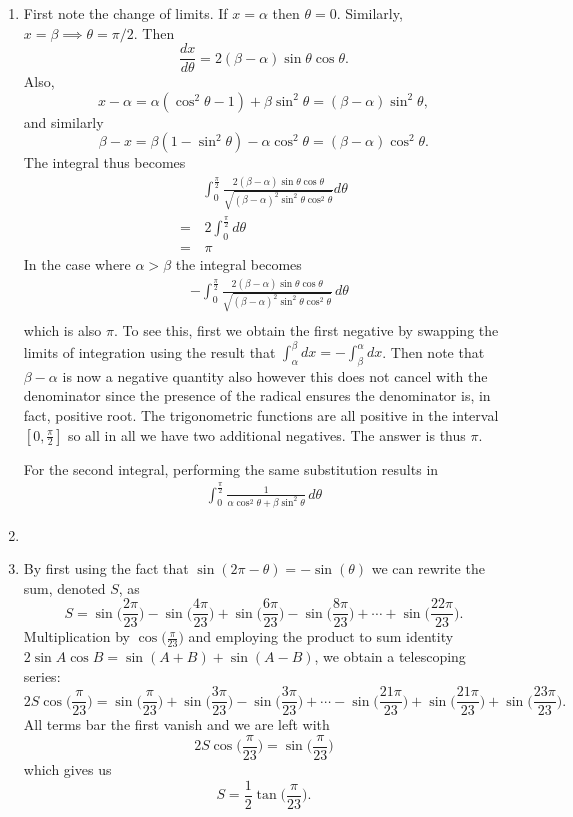 \documentclass{article}
\begin{document}
\begin{enumerate}
    \item First note the change of limits. If \(x=\alpha\) then \(\theta=0\). Similarly, \(x=\beta \implies \theta=\pi/2\). Then
    \[
    \frac{dx}{d\theta} = 2(\beta - \alpha)\sin\theta\cos\theta.
    \]
    Also,
    \[
    x-\alpha = \alpha(\cos^2\theta - 1) + \beta \sin^2\theta = (\beta-\alpha)\sin^2\theta,
    \]
    and similarly
    \[
    \beta - x = \beta(1-\sin^2\theta) - \alpha\cos^2\theta = (\beta-\alpha)\cos^2\theta.
    \]
    The integral thus becomes
    \begin{align*}
        &\int_0^\frac{\pi}{2} \frac{2(\beta-\alpha)\sin\theta\cos\theta}{\sqrt{(\beta-\alpha)^2\sin^2\theta\cos^2\theta}} d\theta \\
        = & \, 2\int_0^\frac{\pi}{2} d\theta \\
        = & \,\pi
    \end{align*}
    In the case where \(\alpha>\beta\) the integral becomes
    \begin{align*}
        &-\int_0^\frac{\pi}{2} \frac{2(\beta-\alpha)\sin\theta\cos\theta}{\sqrt{(\beta-\alpha)^2\sin^2\theta\cos^2\theta}} \, d\theta \\
    \end{align*}
    which is also \(\pi\). To see this, first we obtain the first negative by swapping the limits of integration using the result that \(\int_\alpha^\beta dx= -\int_\beta^\alpha dx\). Then note that \(\beta-\alpha\) is now a negative quantity also however this does not cancel with the denominator since the presence of the radical ensures the denominator is, in fact, positive root. The trigonometric functions are all positive in the interval \([0,\frac{\pi}{2}]\) so all in all we have two additional negatives. The answer is thus \(\pi\).

    For the second integral, performing the same substitution results in
    \begin{align*}
        \int_0^\frac{\pi}{2}\frac{1}{\alpha\cos^2\theta+\beta\sin^2\theta} \, d\theta
    \end{align*}

    \item 

    \item By first using the fact that \(\sin(2\pi-\theta)=-\sin(\theta)\) we can rewrite the sum, denoted \(S\), as
    \[
    S = \sin\bigg(\frac{2\pi}{23}\bigg) - \sin\bigg(\frac{4\pi}{23}\bigg) + \sin\bigg(\frac{6\pi}{23}\bigg) - \sin\bigg(\frac{8\pi}{23}\bigg) + \cdots + \sin\bigg(\frac{22\pi}{23}\bigg).
    \]
    Multiplication by \(\cos\bigg(\frac{\pi}{23}\bigg)\) and employing the product to sum identity \(2 \sin A \cos B = \sin(A+B) + \sin(A-B)\), we obtain a telescoping series:
    \[
    2S \cos\bigg( \frac{\pi}{23}\bigg) = \sin\bigg(\frac{\pi}{23}\bigg) + \sin\bigg(\frac{3\pi}{23}\bigg) - \sin\bigg(\frac{3\pi}{23}\bigg) + \cdots - \sin\bigg(\frac{21\pi}{23}\bigg) + \sin\bigg(\frac{21\pi}{23}\bigg) + \sin\bigg(\frac{23\pi}{23}\bigg).
    \]
    All terms bar the first vanish and we are left with
    \[
    2S \cos \bigg( \frac{\pi}{23} \bigg) = \sin\bigg(\frac{\pi}{23}\bigg)
    \]
    which gives us
    \[
    S = \frac{1}{2}\tan\bigg(\frac{\pi}{23} \bigg).
    \]


\end{enumerate}
\end{document}
